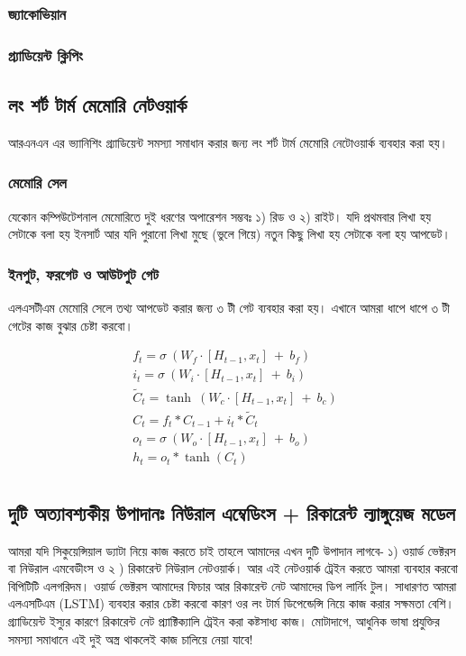 \subsubsection{জ্যাকোভিয়ান}
\subsubsection{গ্র্যাডিয়েন্ট ক্লিপিং}

\subsection{লং শর্ট টার্ম মেমোরি নেটওয়ার্ক}
আরএনএন এর ভ্যানিশিং গ্র্যাডিয়েন্ট সমস্যা সমাধান করার জন্য লং শর্ট টার্ম মেমোরি নেটোওয়ার্ক ব্যবহার করা হয়। 
\subsubsection{মেমোরি সেল}
যেকোন কম্পিউটেশনাল মেমোরিতে দুই ধরণের অপারেশন সম্ভবঃ ১) রিড ও ২) রাইট। যদি প্রথমবার লিখা হয় সেটাকে বলা হয় ইনসার্ট আর যদি পুরানো লিখা মুছে (ভুলে গিয়ে) নতুন কিছু লিখা হয় সেটাকে বলা হয় আপডেট। 
 
\subsubsection{ইনপুট, ফরগেট ও আউটপুট গেট}
এলএসটীএম মেমোরি সেলে তথ্য আপডেট করার জন্য ৩ টী গেট ব্যবহার করা হয়। এখানে আমরা ধাপে ধাপে ৩ টী গেটের কাজ বুঝার চেষ্টা করবো। 
 
\begin{align} %
   f_t = \sigma \ (W_f \cdot [H_{t-1} , x_t] \ + \ b_f) \\
   i_t = \sigma \ (W_i \cdot [H_{t-1} , x_t] \ + \ b_i) \\
   \tilde C_t = \tanh \ (W_c \cdot [H_{t-1} , x_t] \ + \ b_c) \\
   C_t = f_t * C_{t-1} + i_t * \tilde C_t \\
   o_t = \sigma \ (W_o \cdot [H_{t-1} , x_t] \ + \ b_o) \\ 
   h_t = o_t * \tanh(C_t) \\ 
\end{align}

\subsection{দুটি অত্যাবশ্যকীয় উপাদানঃ নিউরাল এম্বেডিংস + রিকারেন্ট ল্যাঙ্গুয়েজ মডেল}
আমরা যদি সিকুয়েন্সিয়াল ড্যাটা নিয়ে কাজ করতে চাই তাহলে আমাদের এখন দুটি উপাদান লাগবে- ১) ওয়ার্ড ভেক্টরস বা নিউরাল এমবেডীংস ও ২ ) রিকারেন্ট নিউরাল নেটওয়ার্ক। 
আর এই নেটওয়ার্ক ট্রেইন করতে আমরা ব্যবহার করবো বিপিটিটি এলগরিদম। ওয়ার্ড ভেক্টরস আমাদের ফিচার আর রিকারেন্ট নেট আমাদের ডিপ লার্নিং টুল। 
সাধারণত আমরা এলএসটিএম (LSTM) ব্যবহার করার চেষ্টা করবো কারণ ওর লং টার্ম ডিপেন্ডেন্সি নিয়ে কাজ করার সক্ষমতা বেশি। গ্র্যাডিয়েন্ট ইস্যুর কারণে রিকারেন্ট নেট প্র্যাক্টিক্যালি ট্রেইন করা 
কষ্টসাধ্য কাজ। মোটাদাগে, আধুনিক ভাষা প্রযুক্তির সমস্যা সমাধানে এই দুই অস্ত্র থাকলেই কাজ চালিয়ে নেয়া যাবে! 


